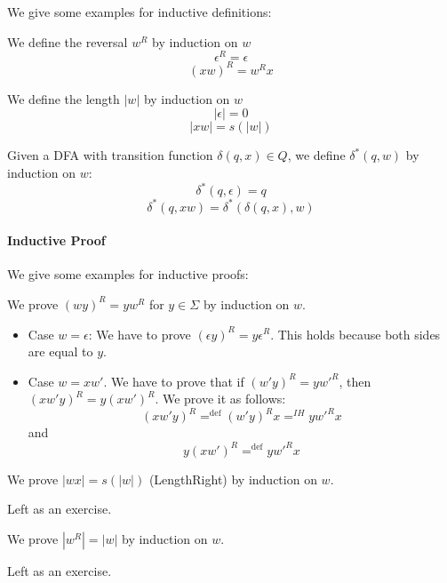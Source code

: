 We give some examples for inductive definitions:

\begin{example}[Reversal]\label{ex:induction:reverse}
We define the reversal $w^R$ by induction on $w$
 \[\epsilon^R=\epsilon\]
 \[(xw)^R=w^Rx\]
\end{example}

\begin{example}[Length]
We define the length $|w|$ by induction on $w$
 \[|\epsilon|=0\]
 \[|xw|=s(|w|)\]
\end{example}

\begin{example}
Given a DFA with transition function $\delta(q,x)\in Q$, we define $\delta^*(q,w)$ by induction on $w$:
 \[\delta^*(q,\epsilon)=q\]
 \[\delta^*(q,xw)=\delta^*(\delta(q,x),w)\]
\end{example}

\paragraph{Inductive Proof}
We give some examples for inductive proofs:

\begin{example}
We prove $(wy)^R=yw^R$ for $y\in\Sigma$ by induction on $w$.
\begin{itemize}
 \item Case $w=\epsilon$: We have to prove $(\epsilon y)^R=y\epsilon^R$. This holds because both sides are equal to $y$.
 \item Case $w=xw'$. We have to prove that if $(w'y)^R=yw'^R$, then $(xw'y)^R=y(xw')^R$.
  We prove it as follows:
    \[(xw'y)^R=^{\mathrm{def}}(w'y)^Rx =^{IH} yw'^Rx\]
  and
    \[y(xw')^R=^{\mathrm{def}} yw'^Rx\]
\end{itemize}
\end{example}

\begin{example}
We prove $|wx|=s(|w|)$ (LengthRight) by induction on $w$.

Left as an exercise.
\end{example}

\begin{example}
We prove $|w^R|=|w|$ by induction on $w$.

Left as an exercise.
\end{example}


